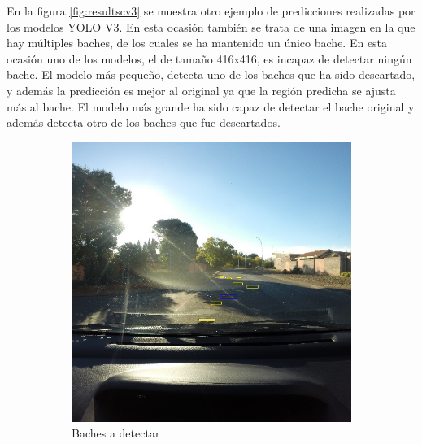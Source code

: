 En la figura \ref{fig:resultscv3} se muestra otro ejemplo de predicciones realizadas por los modelos YOLO V3. En esta ocasión también se trata de una imagen en la que hay múltiples baches, de los cuales se ha mantenido un único bache. En esta ocasión uno de los modelos, el de tamaño 416x416, es incapaz de detectar ningún bache. El modelo más pequeño, detecta uno de los baches que ha sido descartado, y además la predicción es mejor al original ya que la región predicha se ajusta más al bache. El modelo más grande ha sido capaz de detectar el bache original y además detecta otro de los baches que fue descartados.

\begin{figure}[H]
	\centering
	\begin{subfigure}[h]{0.45\linewidth}
		\includegraphics[width=\linewidth]{images/results_c_gt.jpg}
		\caption{Baches a detectar}
	\end{subfigure}
	\begin{subfigure}[h]{0.45\linewidth}

\end{subfigure}
\end{figure}
